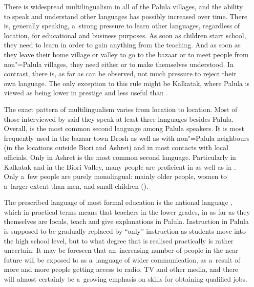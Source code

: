 \largerpage[-1]
There is widespread multilingualism in all of the Palula villages, and the ability to speak and understand other languages has possibly increased over time. There is, generally speaking, a~strong pressure to learn other languages, regardless of location, for educational and business purposes. As soon as children start school, they need to learn \iliUrdu in order to gain anything from the teaching. And as soon as they leave their home village or valley to go to the bazaar or to meet people from non"=Palula villages, they need either \iliKhowar or \iliPashto to make themselves understood. In contrast, there is, as far as can be observed, not much pressure to reject their own language. The only exception to this rule might be Kalkatak, where Palula is viewed as being lower in prestige and less useful than \iliKhowar.

\largerpage
The exact pattern of multilingualism varies from location to location. Most of those interviewed by \citet{decker1992a} said they speak at least three languages besides Palula. Overall, \iliKhowar is the most common second language among Palula speakers. It is most frequently used in the bazaar town Drosh as well as with non"=Palula neighbours (in the locations outside Biori and Ashret) and in most contacts with local officials. Only in Ashret is \iliPashto the most common second language. Particularly in Kalkatak and in the Biori Valley, many people are proficient in \iliKhowar as well as in \iliPashto. Only a~few people are purely monolingual: mainly older people, women to a~larger extent than men, and small children (\citealt{decker1992a}). 


The prescribed language of most formal education is the national language \iliUrdu, which in practical terms means that teachers in the lower grades, in as far as they themselves are locals, teach and give explanations in Palula. Instruction in Palula is supposed to be gradually replaced by ``\iliUrdu only'' instruction as students move into the high school level, but to what degree that is realised practically is rather uncertain. It may be foreseen that an~increasing number of people in the near future will be exposed to \iliUrdu as a~language of wider communication, as a~result of more and more people getting access to radio, TV and other media, and there will almost certainly be a~growing emphasis on \iliUrdu skills for obtaining qualified jobs.


